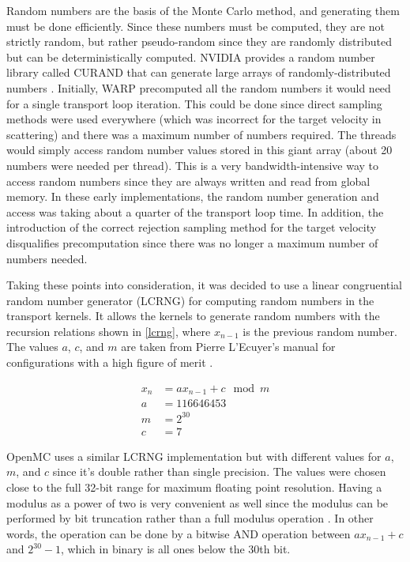 Random numbers are the basis of the Monte Carlo method, and generating them must be done efficiently.  Since these numbers must be computed, they are not strictly random, but rather pseudo-random since they are randomly distributed but can be deterministically computed.  NVIDIA provides a random number library called CURAND that can generate large arrays of randomly-distributed numbers \cite{curand}.  Initially, WARP precomputed all the random numbers it would need for a single transport loop iteration.  This could be done since direct sampling methods were used everywhere (which was incorrect for the target velocity in scattering) and there was a maximum number of numbers required.  The threads would simply access random number values stored in this giant array (about 20 numbers were needed per thread).  This is a very bandwidth-intensive way to access random numbers since they are always written and read from global memory.  In these early implementations, the random number generation and access was taking about a quarter of the transport loop time.  In addition, the introduction of the correct rejection sampling method for the target velocity disqualifies precomputation since there was no longer a maximum number of numbers needed.

Taking these points into consideration, it was decided to use a linear congruential random number generator (LCRNG) for computing random numbers in the transport kernels.  It allows the kernels to generate random numbers with the recursion relations shown in \eqref{lcrng}, where $x_{n-1}$ is the previous random number.  The values $a$, $c$, and $m$ are taken from Pierre L'Ecuyer's manual for configurations with a high figure of merit \cite{lcrng}.   %

\begin{equation}
\begin{split}
x_{n} &= a x_{n-1} + c \mod m  \\
a &= 116646453 \\
m &=  2^{30} \\
c &= 7
\end{split}
\label{lcrng}
\end{equation}

OpenMC uses a similar LCRNG implementation but with different values for $a$, $m$, and $c$ since it's double rather than single precision.  The values were chosen close to the full 32-bit range for maximum floating point resolution.  Having a modulus as a power of two is very convenient as well since the modulus can be performed by bit truncation rather than a full modulus operation \cite{openmc}.  In other words, the operation can be done by a bitwise AND operation between $a x_{n-1} + c$ and $2^{30}-1$, which in binary is all ones below the 30th bit.

